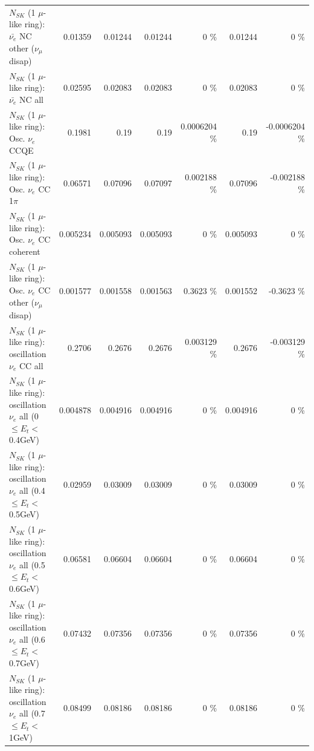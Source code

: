 \begin{table}
\begin{tabular}{| l | r | r | r  r | r  r |}
          $N_{SK}$ (1 $\mu$-like ring): $\bar{\nu_e}$ NC other ($\nu_\mu$ disap) &         0.01359 &         0.01244 &         0.01244 &        0 \%  &         0.01244 &        0 \%  \\ 
                            $N_{SK}$ (1 $\mu$-like ring): $\bar{\nu_{e}}$ NC all &         0.02595 &         0.02083 &         0.02083 &        0 \%  &         0.02083 &        0 \%  \\ 
\hline
\hline
\hline
                                 $N_{SK}$ (1 $\mu$-like ring): Osc. $\nu_e$ CCQE &          0.1981 &            0.19 &            0.19 & 0.0006204 \%  &            0.19 & -0.0006204 \%  \\ 
                            $N_{SK}$ (1 $\mu$-like ring): Osc. $\nu_e$ CC 1$\pi$ &         0.06571 &         0.07096 &         0.07097 & 0.002188 \%  &         0.07096 & -0.002188 \%  \\ 
                          $N_{SK}$ (1 $\mu$-like ring): Osc. $\nu_e$ CC coherent &        0.005234 &        0.005093 &        0.005093 &        0 \%  &        0.005093 &        0 \%  \\ 
           $N_{SK}$ (1 $\mu$-like ring): Osc. $\nu_e$ CC other ($\nu_\mu$ disap) &        0.001577 &        0.001558 &        0.001563 &   0.3623 \%  &        0.001552 &  -0.3623 \%  \\ 
                        $N_{SK}$ (1 $\mu$-like ring): oscillation $\nu_e$ CC all &          0.2706 &          0.2676 &          0.2676 & 0.003129 \%  &          0.2676 & -0.003129 \%  \\ 
\hline
$N_{SK}$ (1 $\mu$-like ring): oscillation $\nu_{e}$ all (0 $\leq E_{t} <$ 0.4GeV) &        0.004878 &        0.004916 &        0.004916 &        0 \%  &        0.004916 &        0 \%  \\ 
$N_{SK}$ (1 $\mu$-like ring): oscillation $\nu_{e}$ all (0.4 $\leq E_{t} <$ 0.5GeV) &         0.02959 &         0.03009 &         0.03009 &        0 \%  &         0.03009 &        0 \%  \\ 
$N_{SK}$ (1 $\mu$-like ring): oscillation $\nu_{e}$ all (0.5 $\leq E_{t} <$ 0.6GeV) &         0.06581 &         0.06604 &         0.06604 &        0 \%  &         0.06604 &        0 \%  \\ 
$N_{SK}$ (1 $\mu$-like ring): oscillation $\nu_{e}$ all (0.6 $\leq E_{t} <$ 0.7GeV) &         0.07432 &         0.07356 &         0.07356 &        0 \%  &         0.07356 &        0 \%  \\ 
$N_{SK}$ (1 $\mu$-like ring): oscillation $\nu_{e}$ all (0.7 $\leq E_{t} <$ 1GeV) &         0.08499 &         0.08186 &         0.08186 &        0 \%  &         0.08186 &        0 \%  \\ 

\end{tabular}
\end{table}

